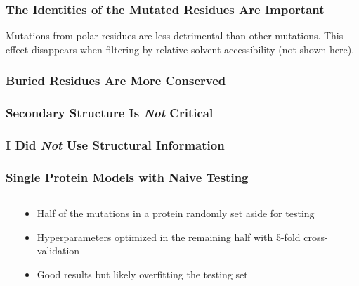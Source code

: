 \documentclass[10pt, british]{beamer}
\begin{document}
\begin{frame}
	\frametitle{The Identities of the Mutated Residues Are Important}
	Mutations from polar residues are less detrimental than other mutations.
	This effect disappears when filtering by relative solvent accessibility (not shown here).
	\vfill%
	\centering%
	{%
		\let\bfseries\sbseries%
		
	}
\end{frame}

\begin{frame}
	\frametitle{Buried Residues Are More Conserved}
	\centering%
	{%
		\let\bfseries\sbseries%
		
	}
\end{frame}

\begin{frame}
	\frametitle{Secondary Structure Is \textbf{\textit{Not}} Critical}
	\centering%
	{%
		\let\bfseries\sbseries%
		
	}
\end{frame}

\begin{frame}
	\frametitle{I Did \textbf{\textit{Not}} Use Structural Information}
	\begin{figure}
		
	\end{figure}
\end{frame}

\begin{frame}
	\frametitle{Single Protein Models with Naive Testing}
	\begin{columns}[c]
		\begin{column}{.6\textwidth}
			\centering%
			\vspace{1em}
			{%
				\let\bfseries\sbseries%
				
			}
		\end{column}
		\begin{column}{.4\textwidth}
			\begin{itemize}
				\item Half of the mutations in a protein randomly set aside for testing
				\item Hyperparameters optimized in the remaining half with 5-fold cross-validation
				\item Good results but likely overfitting the testing set
			\end{itemize}
		\end{column}
	\end{columns}
\end{frame}
\end{document}
